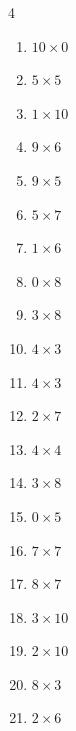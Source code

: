 \begin{multicols}{4}
\begin{enumerate}
  \item $10\times 0$
        \phantom{$=0$}

  \item $5\times 5$
        \phantom{$=25$}

  \item $1\times 10$
        \phantom{$=10$}

  \item $9\times 6$
        \phantom{$=54$}

  \item $9\times 5$
        \phantom{$=45$}

  \item $5\times 7$
        \phantom{$=35$}

  \item $1\times 6$
        \phantom{$=6$}

  \item $0\times 8$
        \phantom{$=0$}

  \item $3\times 8$
        \phantom{$=24$}

  \item $4\times 3$
        \phantom{$=12$}

  \item $4\times 3$
        \phantom{$=12$}

\columnbreak %

  \item $2\times 7$
        \phantom{$=14$}

  \item $4\times 4$
        \phantom{$=16$}

  \item $3\times 8$
        \phantom{$=24$}

  \item $0\times 5$
        \phantom{$=0$}

  \item $7\times 7$
        \phantom{$=49$}

  \item $8\times 7$
        \phantom{$=56$}

  \item $3\times 10$
        \phantom{$=30$}

  \item $2\times 10$
        \phantom{$=20$}

  \item $8\times 3$
        \phantom{$=24$}

  \item $2\times 6$
        \phantom{$=12$}


\end{enumerate}
\end{multicols}
